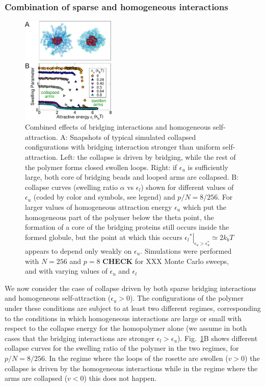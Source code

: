 \documentclass[
preprint,
a4paper,
12pt,
superscriptaddress,
pre]{revtex4}
\begin{document}
\subsubsection*{Combination of sparse and homogeneous interactions} 

\begin{figure}
  \centering
  \includegraphics[width=0.4\textwidth]{fig4}
  \caption{Combined effects of bridging interactions and
      homogeneous self-attraction.  A: Snapshots of  typical simulated
      collapsed configurations with bridging interaction stronger than
      uniform self-attraction. Left: the collapse is driven
      by bridging,  while the rest of the polymer forms closed swollen
      loops. Right: if $\epsilon_u$ is sufficiently large, both core
      of bridging beads and looped arms are collapsed. 
    B: collapse curves (swelling ratio $\alpha$ vs $\epsilon_l$) shown for
    different values of $\epsilon_u$ (coded by color and symbols, see
    legend) and $p/N = 8/256$.
%
    For larger values of homogeneous attraction energy $\epsilon_u$
    which put the homogeneous part of the polymer below the theta
    point, the formation of a core  of the bridging proteins still occurs inside
    the formed globule, but the point at which this  occurs
    $\left.{\epsilon_l}^*\right|_{\epsilon_u > \epsilon_u^*} \simeq 2k_bT$
    appears to depend only weakly on $\epsilon_u$.
%
    Simulations were  performed with $N=256$ and $p=8$
    \textbf{CHECK} for XXX Monte Carlo sweeps, and with varying values
    of $\epsilon_u$ and $\epsilon_l$ }
  \label{fig:4}
\end{figure}

We now consider the case of collapse driven by both sparse bridging
interactions and homogeneous self-attraction ($\epsilon_u > 0$).  The
configurations of the polymer under these conditions are subject to at
least two different regimes, corresponding to the conditions in which
homogeneous interactions are large or small with respect to the
collapse energy for the homopolymer alone (we assume in both cases
that the bridging interactions are stronger $\epsilon_l >
\epsilon_u$).
Fig.~\ref{fig:4}B shows different collapse curves for the swelling
ratio of the polymer in the two regimes, for $p/N = 8/256$. In the
regime where the loops of the rosette are swollen ($v  > 0$)
the collapse is driven by the homogeneous interactions while in the
regime where the arms are collapsed ($v  < 0$) this does not
happen. 
%
\end{document}
